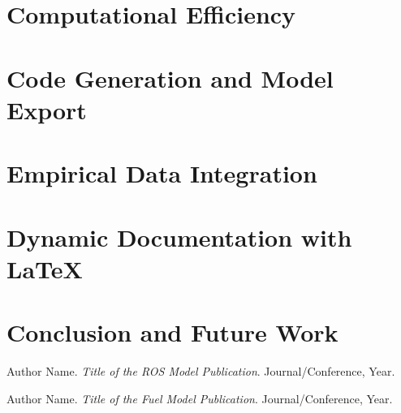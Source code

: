 \documentclass{article}
\begin{document}
\section{Computational Efficiency}

\section{Code Generation and Model Export}

\section{Empirical Data Integration}

\section{Dynamic Documentation with LaTeX}

\section{Conclusion and Future Work}


\begin{thebibliography}{9}
Author Name. 
\textit{Title of the ROS Model Publication}. 
Journal/Conference, Year.

Author Name. 
\textit{Title of the Fuel Model Publication}. 
Journal/Conference, Year.


\end{thebibliography}
\end{document}

